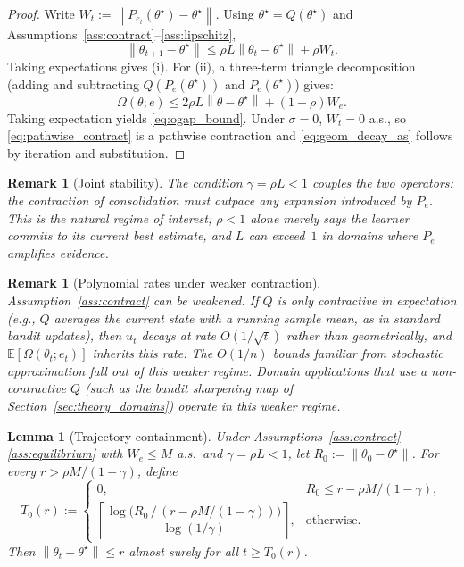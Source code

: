 \documentclass[12pt,a4paper]{article}
\newtheorem{remark}[definition]{Remark}
\newtheorem{lemma}[definition]{Lemma}
\newcommand{\norm}[1]{\left\lVert#1\right\rVert}
\newcommand{\Ogap}{\Omega}
\begin{document}
\begin{proof}
Write $W_t := \norm{P_{e_t}(\theta^\star) - \theta^\star}$. Using
$\theta^\star = Q(\theta^\star)$ and
Assumptions~\ref{ass:contract}--\ref{ass:lipschitz},
\begin{equation}
\label{eq:pathwise_contract}
\norm{\theta_{t+1} - \theta^\star}
\leq \rho L \norm{\theta_t - \theta^\star} + \rho W_t.
\end{equation}
Taking expectations gives (i). For (ii), a three-term triangle decomposition
(adding and subtracting $Q(P_e(\theta^\star))$ and $P_e(\theta^\star)$) gives:
\[
  \Ogap(\theta; e) \leq 2\rho L \norm{\theta - \theta^\star} + (1+\rho) W_e.
\]
Taking expectation yields \eqref{eq:ogap_bound}. Under $\sigma = 0$,
$W_t = 0$ a.s., so \eqref{eq:pathwise_contract} is a pathwise contraction
and \eqref{eq:geom_decay_as} follows by iteration and substitution. \qedhere
\end{proof}

\begin{remark}[Joint stability]
\label{rem:joint_stability}
The condition $\gamma = \rho L < 1$ couples the two operators: the
contraction of consolidation must outpace any expansion introduced by $P_e$.
This is the natural regime of interest; $\rho < 1$ alone merely says the
learner commits to its current best estimate, and $L$ can exceed~$1$ in
domains where $P_e$ amplifies evidence.
\end{remark}

\begin{remark}[Polynomial rates under weaker contraction]
\label{rem:polynomial_rates}
Assumption~\ref{ass:contract} can be weakened. If $Q$ is only
\emph{contractive in expectation} (e.g., $Q$ averages the current state with a running
sample mean, as in standard bandit updates), then $u_t$ decays at rate
$O(1/\sqrt{t})$ rather than geometrically, and $\mathbb{E}[\Ogap(\theta_t;
e_t)]$ inherits this rate. The $O(1/n)$ bounds familiar from stochastic
approximation fall out of this weaker regime. Domain applications that use
a non-contractive $Q$ (such as the bandit sharpening map of
Section~\ref{sec:theory_domains}) operate in this weaker regime.
\end{remark}

\begin{lemma}[Trajectory containment]
\label{lem:containment}
Under Assumptions~\ref{ass:contract}--\ref{ass:equilibrium} with
$W_e \leq M$ a.s.\ and $\gamma = \rho L < 1$, let
$R_0 := \norm{\theta_0 - \theta^\star}$. For every $r > \rho M/(1-\gamma)$,
define
\[
  T_0(r) :=
  \begin{cases}
    0, & R_0 \leq r - \rho M/(1-\gamma),\\[4pt]
    \left\lceil
      \dfrac{\log\bigl(R_0\,/\,(r - \rho M/(1-\gamma))\bigr)}{\log(1/\gamma)}
    \right\rceil, & \text{otherwise.}
  \end{cases}
\]
Then $\norm{\theta_t - \theta^\star} \leq r$ almost surely for all
$t \geq T_0(r)$.
\end{lemma}
\end{document}
